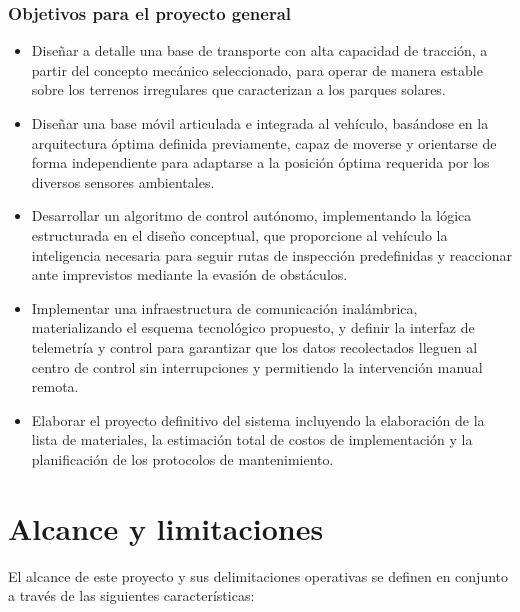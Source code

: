 \subsubsection{Objetivos para el proyecto general}
\begin{itemize}
    \item Diseñar a detalle una base de transporte con alta capacidad de tracción, a partir del concepto mecánico seleccionado, para operar de manera estable sobre los terrenos irregulares que caracterizan a los parques solares.
    \item Diseñar una base móvil articulada e integrada al vehículo, basándose en la arquitectura óptima definida previamente, capaz de moverse y orientarse de forma independiente para adaptarse a la posición óptima requerida por los diversos sensores ambientales.
    \item Desarrollar un algoritmo de control autónomo, implementando la lógica estructurada en el diseño conceptual, que proporcione al vehículo la inteligencia necesaria para seguir rutas de inspección predefinidas y reaccionar ante imprevistos mediante la evasión de obstáculos.
    \item Implementar una infraestructura de comunicación inalámbrica, materializando el esquema tecnológico propuesto, y definir la interfaz de telemetría y control para garantizar que los datos recolectados lleguen al centro de control sin interrupciones y permitiendo la intervención manual remota.
    \item Elaborar el proyecto definitivo del sistema incluyendo la elaboración de la lista de materiales, la estimación total de costos de implementación y la planificación de los protocolos de mantenimiento.
\end{itemize}

\section{Alcance y limitaciones}
El alcance de este proyecto y sus delimitaciones operativas se definen en conjunto a través de las siguientes características:

